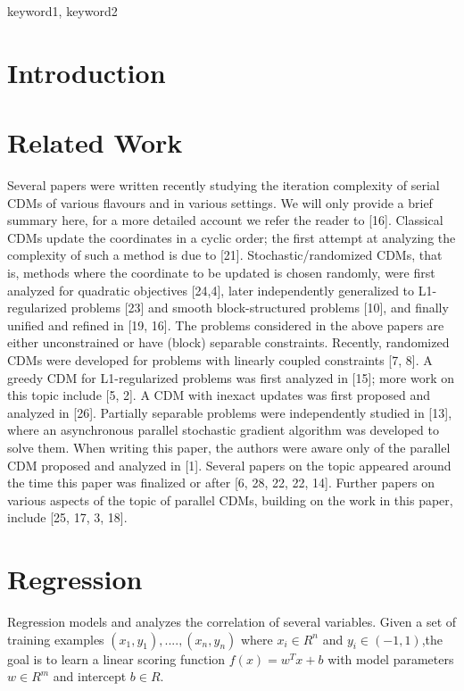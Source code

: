 \documentclass{sigplanconf}
\begin{document}

\keywords
keyword1, keyword2

\section{Introduction}

\section{Related Work}
Several papers were written recently studying the iteration complexity of serial CDMs of various flavours and in various settings. 
We will only provide a brief summary here, for a more detailed account we refer the reader to [16]. Classical CDMs update the coordinates in a cyclic order; 
the first attempt at analyzing the complexity of such a method is due to [21]. Stochastic/randomized CDMs, that is, methods where
the coordinate to be updated is chosen randomly, were first analyzed for quadratic objectives [24,4], later independently generalized to
L1-regularized problems [23] and smooth block-structured problems [10], and finally unified and refined in [19, 16]. 
The problems considered in the above papers are either unconstrained or have (block) separable constraints. Recently, randomized CDMs
were developed for problems with linearly coupled constraints [7, 8]. A greedy CDM for L1-regularized problems was 
first analyzed in [15]; more work on this topic include [5, 2]. A CDM with inexact updates was first proposed and analyzed in [26]. Partially
separable problems were independently studied in [13], where an asynchronous parallel stochastic
gradient algorithm was developed to solve them.
When writing this paper, the authors were aware only of the parallel CDM proposed and analyzed in [1]. Several papers on the 
topic appeared around the time this paper was finalized or after [6, 28, 22, 22, 14]. Further papers on various aspects of the 
topic of parallel CDMs, building on the work in this paper, include [25, 17, 3, 18].

\section{Regression}
\noindent
Regression models and analyzes the correlation of several variables. Given a set of training examples 
\begin{math}(x_1,y_1),....,(x_n,y_n)\end{math} where \begin{math} x_i \in R^n \end{math}
and \begin{math} y_i \in (-1,1) \end{math},the goal is to learn a linear scoring function
\begin{math} f(x) = w^Tx + b \end{math} with model parameters \begin{math} w \in R^m \end{math}
and intercept \begin{math} b \in R. \end{math}\\
\end{document}

